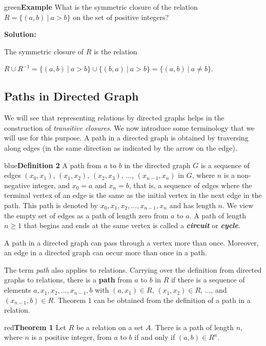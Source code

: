 \documentclass[11pt]{article}
\newenvironment{example}[1][\unskip]{\begin{mybox}{green}{\textbf{Example} {#1}}}{\end{mybox}}
\newenvironment{definition}[1]{\begin{mybox}{blue}{\textbf{Definition #1}}}{\end{mybox}}
\newenvironment{theorem}[1]{\begin{mybox}{red}{\textbf{Theorem #1}}}{\end{mybox}}
\begin{document}
\begin{example}
What is the symmetric closure of the relation $R = \{(a, b)\ |\ a > b\}$ on the set of positive integers?

\textbf{Solution:}

The symmetric closure of $R$ is the relation

$R \cup R^{-1} = \{(a, b)\ |\ a > b\} \cup \{(b, a)\ |\ a > b\} = \{(a, b)\ |\ a \neq b\}$.
\end{example}

\subsection{Paths in Directed Graph}

We will see that representing relations by directed graphs helps in the construction of \textit{transitive closures}. We now introduce some terminology that we will use for this purpose. A path in a directed graph is obtained by traversing along edges (in the same direction as indicated by the arrow on the edge).

\begin{definition}{2}
A path from $a$ to $b$ in the directed graph $G$ is a sequence of edges $(x_0, x_1)$, $(x_1, x_2)$, $(x_2, x_3)$, ..., $(x_{n-1}, x_n)$ in $G$, where $n$ is a non-negative integer, and $x_0 = a$ and $x_n = b$, that is, a sequence of edges where the terminal vertex of an edge is the same as the initial vertex in the next edge in the path. This path is denoted by $x_0, x_1, x_2, ..., x_{n-1}, x_n$ and has length $n$. We view the empty set of edges as a path of length zero from $a$ to $a$. A path of length $n \geq 1$ that begins and ends at the same vertex is called a \textit{\textbf{circuit}} or \textit{\textbf{cycle}}.
\end{definition}

A path in a directed graph can pass through a vertex more than once. Moreover, an edge in a directed graph can occur more than once in a path.


The term \textit{path} also applies to relations. Carrying over the definition from directed graphs to relations, there is a \textbf{path} from $a$ to $b$ in $R$ if there is a sequence of elements $a, x_1, x_2, ..., x_{n-1}, b$ with $(a, x_1) \in R$, $(x_1, x_2) \in R$, ..., and $(x_{n-1}, b) \in R$. Theorem 1 can be obtained from the definition of a path in a relation.

\begin{theorem}{1}
Let $R$ be a relation on a set $A$. There is a path of length $n$, where $n$ is a positive integer, from $a$ to $b$ if and only if $(a, b) \in R^n$.
\end{theorem}
\end{document}
